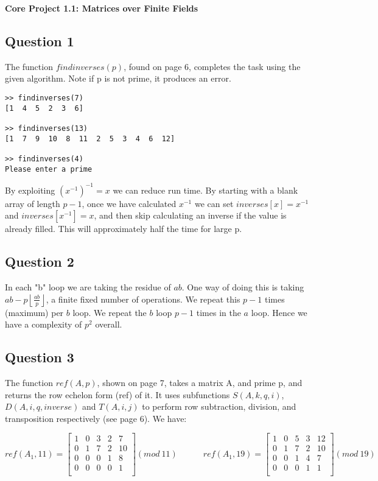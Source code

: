 \documentclass[10pt,a4paper]{report}
\begin{document}
\textbf{Core Project 1.1: Matrices over Finite Fields}
\thispagestyle{empty}

\newpage

\subsection*{Question 1}

The function $findinverses(p)$, found on page 6, completes the task using the given algorithm. Note if p is not prime, it produces an error.\
\begin{verbatim}
>> findinverses(7)
[1  4  5  2  3  6]

>> findinverses(13)
[1  7  9  10  8  11  2  5  3  4  6  12] 

>> findinverses(4)
Please enter a prime
\end{verbatim}

By exploiting $(x^{-1})^{-1} = x$ we can reduce run time. By starting with a blank array of length $p-1$, once we have calculated $x^{-1}$ we can set $inverses[x]=x^{-1}$ and $inverses[x^{-1}]=x$, and then skip calculating an inverse if the value is already filled. This will approximately half the time for large p.
	
\subsection*{Question 2}
In each "b" loop we are taking the residue of $ab$. One way of doing this is taking $ab-p\left \lfloor{\frac{ab}{p}}\right \rfloor $, a finite fixed number of operations. We repeat this $p-1$ times (maximum) per $b$ loop. We repeat the $b$ loop $p-1$ times in the $a$ loop. Hence we have a complexity of $p^2$ overall.


\subsection*{Question 3}

The function $ref(A,p)$, shown on page 7, takes a matrix A, and prime p, and returns the row echelon form (ref) of it. It uses subfunctions $S(A,k,q,i)$, $D(A,i,q,inverse)$ and $T(A,i,j)$ to perform row subtraction, division, and transposition respectively (see page 6). We have:

\vspace{5mm}

\begin{equation*}
ref(A_1,11)=\begin{bmatrix}
1 & 0 & 3 & 2 & 7 \\
0 & 1 & 7 & 2 & 10\\
0 & 0 & 0 & 1 & 8\\
0 & 0 & 0 & 0 & 1\\
\end{bmatrix} (mod \: 11)
\quad \quad \quad
ref(A_1,19)=\begin{bmatrix}
1 & 0 & 5 & 3 & 12 \\
0 & 1 & 7 & 2 & 10\\
0 & 0 & 1 & 4 & 7\\
0 & 0 & 0 & 1 & 1\\
\end{bmatrix} (mod \: 19)
\end{equation*}
\end{document}
